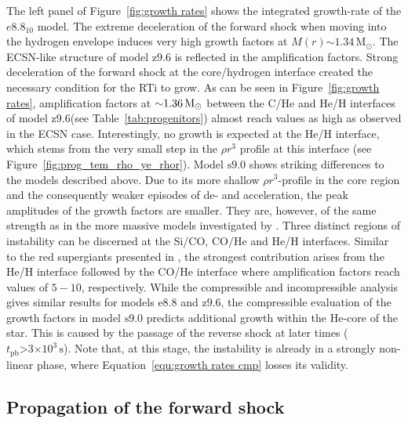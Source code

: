 \documentclass[fleqn,usenatbib]{mnras}
\newcommand{\tpb}{\ensuremath{t_{\text{pb}}}}
\newcommand{\solm}{\ensuremath{\rm{M_{\odot}}}\xspace}
\newcommand{\s}{\ensuremath{\text{s}}}
\newcommand{\onemg}{\ensuremath{\mathrm{e8.8}}\xspace}
\newcommand{\snine}{\ensuremath{\mathrm{s9.0}}\xspace}
\newcommand{\znine}{\ensuremath{\mathrm{z9.6}}\xspace}
\newcommand{\GEO}[1]{{\color{red}#1}}
\begin{document}
The left panel of Figure~\ref{fig:growth rates} shows the integrated growth-rate of the $e8.8_{10}$ model.
The extreme deceleration of the forward shock when moving into the hydrogen envelope induces very high growth factors at $M(r)\mathord{\sim}1.34\,\mathrm{M_{\odot}}$.
The ECSN-like structure of model \znine is reflected in the amplification factors.
Strong deceleration of the forward shock at the core/hydrogen interface created the necessary condition for the RTi to grow. As can be seen in Figure~\ref{fig:growth rates}, amplification factors at $\mathord{\sim}1.36\,\solm$ between the C/He and He/H interfaces of model \znine (see Table~\ref{tab:progenitors}) almost reach values as high as observed in the ECSN case. Interestingly, no growth is expected at the He/H interface, which stems from the very small step in the $\rho r^3$ profile at this interface (see Figure~\ref{fig:prog_tem_rho_ye_rhor}).
Model \snine shows striking differences to the models described above. 
Due to its more shallow $\rho r^3$-profile in the core region and the consequently weaker episodes of de- and acceleration, the peak amplitudes of the growth factors are smaller. They are, however, of the same strength as in the more massive models investigated by \cite{Wongwathanarat2015}. 
\GEO{
Three distinct regions of instability can be discerned at the Si/CO, CO/He and He/H interfaces. 
Similar to the red supergiants presented in \citet{Wongwathanarat2015}, the strongest contribution arises from the He/H interface followed by the CO/He interface where amplification factors  reach values of $5-10$, respectively. 
While the compressible and incompressible analysis gives similar results for models \onemg and \znine, the compressible evaluation of the growth factors in model \snine predicts additional growth within the He-core of the star. This is caused by the passage of the reverse shock at later times ($\tpb\mathord{>}3\mathord{\times}10^3\,\s$). Note that, at this stage, the instability is already in a strongly non-linear phase, where Equation~\ref{equ:growth rates cmp} losses its validity.
}
\subsection{Propagation of the forward shock}
\end{document}

